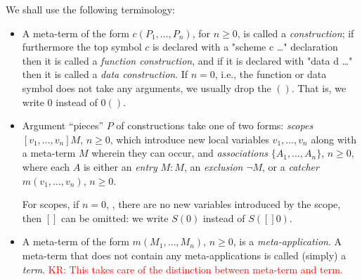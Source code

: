 \documentclass[letterpaper,11pt]{article}
\newcommand{\KR}[1]{\textcolor{red}{KR: #1}}
\newcommand{\MS}[1]{\textcolor{violet}{MS: #1}}
\begin{document}
We shall use the following terminology:
\begin{itemize}

\item A meta-term of the form $c(P_1,…,P_n)$, for $n≥0$, is called a \emph{construction}; if furthermore
  the top symbol $c$ is declared with a "scheme c {…}" declaration then it is called a
  \emph{function construction}, and if it is declared with "data d {…}" then it is called a
  \emph{data construction}. If $n=0$, i.e., the function or data symbol does not take any arguments,
  we usually drop the $()$. That is, we write $0$ instead of $0()$.


\item Argument ``pieces'' $P$ of constructions take one of two forms: \emph{scopes} $[v_1,…,v_n]M$,
  $n≥0$, which introduce new local variables $v_1,…,v_n$ along with a meta-term $M$ wherein they can
  occur, and \emph{associations} $\{A_1,…,A_n\}$, $n≥0$, where each $A$ is either an \emph{entry}
  $M:M$, an \emph{exclusion} $¬M$, or a \emph{catcher} $m(v_1,…,v_n)$, $n≥0$.

  For scopes, if $n=0$, \ie, there are no new variables introduced by the scope, then $[]$ can be
  omitted: we write $S(0)$ instead of $S([]0)$.

\item A meta-term of the form $m(M_1,…,M_n)$, $n≥0$, is a \emph{meta-application}.  A meta-term that
  does not contain any meta-applications is called (simply) a \emph{term}.
  \KR{This takes care of the distinction between meta-term and term.}


\end{itemize}
\end{document}
